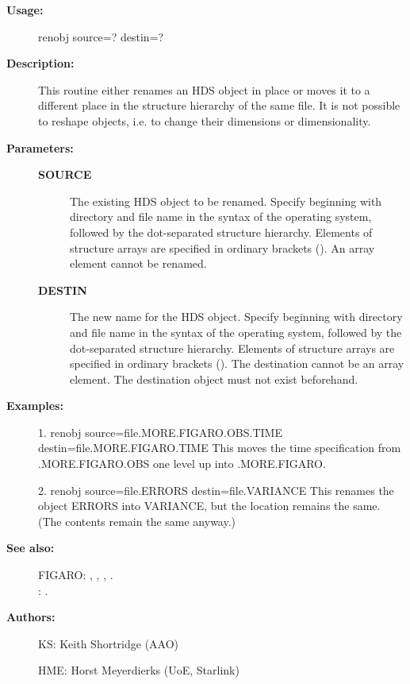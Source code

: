 \begin{description}
\begin{description}
\item [\textbf{Usage:}]
 renobj source=? destin=?

\item [\textbf{Description:}]
 This routine either renames an HDS object in place or moves it to
 a different place in the structure hierarchy of the same file. It
 is not possible to reshape objects, i.e. to change their
 dimensions or dimensionality.

\item [\textbf{Parameters:}]
\begin{description}
\item [\textbf{SOURCE}]
 The existing HDS object to be renamed.  Specify beginning with
 directory and file name in the syntax of the operating system,
 followed by the dot-separated structure hierarchy. Elements of
 structure arrays are specified in ordinary brackets (). An
 array element cannot be renamed.
\item [\textbf{DESTIN}]
 The new name for the HDS object.  Specify beginning with
 directory and file name in the syntax of the operating system,
 followed by the dot-separated structure hierarchy. Elements of
 structure arrays are specified in ordinary brackets (). The
 destination cannot be an array element. The destination object
 must not exist beforehand.
\end{description}

\item [\textbf{Examples:}]
\begin{terminalv}
 1.  renobj source=file.MORE.FIGARO.OBS.TIME destin=file.MORE.FIGARO.TIME
   This moves the time specification from .MORE.FIGARO.OBS one
   level up into .MORE.FIGARO.

 2.  renobj source=file.ERRORS destin=file.VARIANCE
   This renames the object ERRORS into VARIANCE, but the location
   remains the same. (The contents remain the same anyway.)

\end{terminalv}

\item [\textbf{See also:}]
FIGARO: , , , .\\
: .\\

\item [\textbf{Authors:}]
 KS: Keith Shortridge (AAO)

 HME: Horst Meyerdierks (UoE, Starlink)


\end{description}
\end{description}
